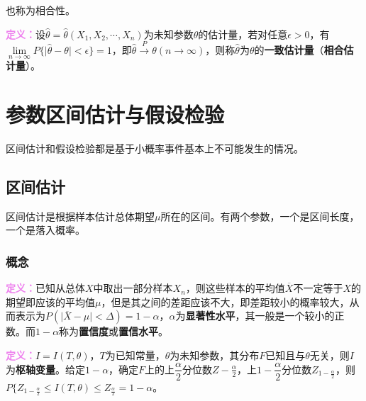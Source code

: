 \documentclass[UTF8, 12pt]{ctexart}
\begin{document}
也称为相合性。

\textcolor{violet}{\textbf{定义：}}设$\hat{\theta}=\hat{\theta}(X_1,X_2,\cdots,X_n)$为未知参数$\theta$的估计量，若对任意$\epsilon>0$，有$\lim\limits_{n\to\infty}P\{\vert\hat{\theta}-\theta\vert<\epsilon\}=1$，即$\hat{\theta}\overset{P}{\longrightarrow}\theta(n\to\infty)$，则称$\hat{\theta}$为$\theta$的\textbf{一致估计量}（\textbf{相合估计量}）。

\section{参数区间估计与假设检验}



区间估计和假设检验都是基于小概率事件基本上不可能发生的情况。

\subsection{区间估计}

区间估计是根据样本估计总体期望$\mu$所在的区间。有两个参数，一个是区间长度，一个是落入概率。

\subsubsection{概念}

\textcolor{violet}{\textbf{定义：}}已知从总体$X$中取出一部分样本$X_n$，则这些样本的平均值$\overline{X}$不一定等于$X$的期望即应该的平均值$\mu$，但是其之间的差距应该不大，即差距较小的概率较大，从而表示为$P(\vert\overline{X}-\mu\vert<\Delta)=1-\alpha$，$\alpha$为\textbf{显著性水平}，其一般是一个较小的正数。而$1-\alpha$称为\textbf{置信度}或\textbf{置信水平}。

\textcolor{violet}{\textbf{定义：}}$I=I(T,\theta)$，$T$为已知常量，$\theta$为未知参数，其分布$F$已知且与$\theta$无关，则$I$为\textbf{枢轴变量}。给定$1-\alpha$，确定$F$上的上$\dfrac{\alpha}{2}$分位数$Z-{\frac{\alpha}{2}}$，上$1-\dfrac{\alpha}{2}$分位数$Z_{1-\frac{\alpha}{2}}$，则$P\{Z_{1-\frac{\alpha}{2}}\leqslant I(T,\theta)\leqslant Z_{\frac{\alpha}{2}}=1-\alpha$。
\end{document}

